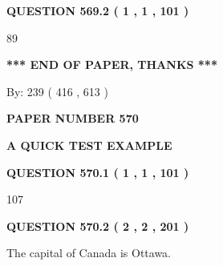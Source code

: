 \documentclass[12pt]{article}
\begin{document}
{\textbf{\Large{QUESTION
569.2 
 ( 1 , 1 , 101 )
}}}
  
  
 
 
\noindent{}

89
 
 
   
   
 \vspace{0.2in}
 
   
   
   
   
\vspace{1.0in} 
{\textbf{\large{ *** END OF PAPER, THANKS *** }}} 
   
   
\hspace{1.0in} By: 
 239 ( 416 ,  613 )
   
   
   
   
\newpage 
\setcounter{page}{ 
   570001 } 
   
   
   
   
 {\textbf{ \Large{ PAPER NUMBER  570  }}}
   
   
\vspace{0.2in}
   
   
   
   
   
   
 \vspace{0.2in}
{\LARGE {\textbf{ A QUICK TEST EXAMPLE}}}
   
   
  
\vspace{0.2in}
  
{\textbf{\Large{QUESTION
570.1 
 ( 1 , 1 , 101 )
}}}
  
  
 
 
\noindent{}

107
 
 
  
\vspace{0.2in}
  
{\textbf{\Large{QUESTION
570.2 
 ( 2 , 2 , 201 )
}}}
  
  
 
 
\noindent{}
 
 
The capital of Canada is Ottawa.
 
\end{document}
